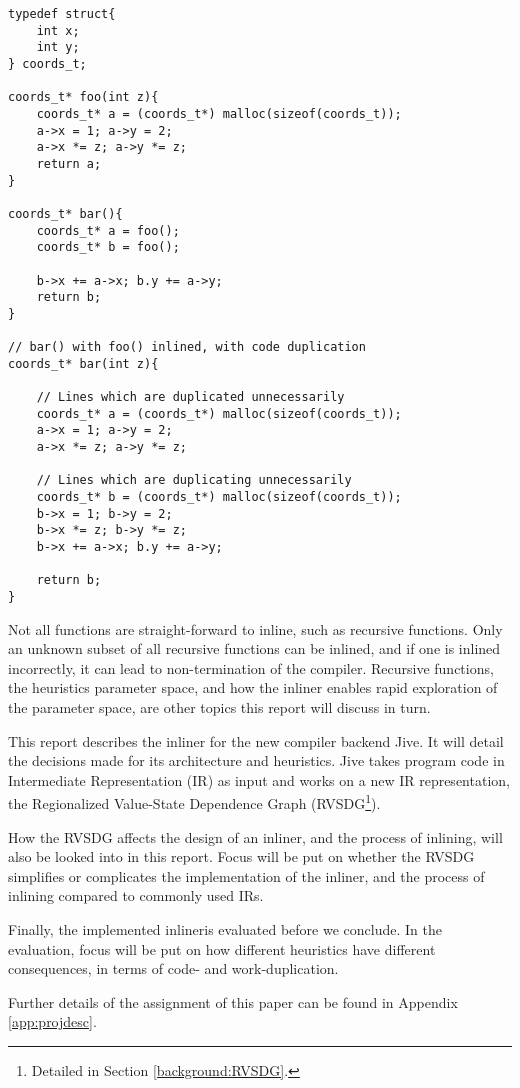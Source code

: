 \begin{lstlisting}[label={lst:code-dup}, style=customcpp,
caption={Code duplication in \textit{bar()}, when inlining \textit{foo()} into
\textit{bar()}. Total code size (counted by number of statements) for the
functions \textit{foo()} and \textit{bar()} are 11 when not inlined, and 13 when
inlined.}]
typedef struct{
	int x;
	int y;
} coords_t;

coords_t* foo(int z){
	coords_t* a = (coords_t*) malloc(sizeof(coords_t));
	a->x = 1; a->y = 2;
	a->x *= z; a->y *= z;
	return a;
}

coords_t* bar(){
	coords_t* a = foo();
	coords_t* b = foo();

	b->x += a->x; b.y += a->y;
	return b;
}

// bar() with foo() inlined, with code duplication
coords_t* bar(int z){

	// Lines which are duplicated unnecessarily
	coords_t* a = (coords_t*) malloc(sizeof(coords_t));
	a->x = 1; a->y = 2;
	a->x *= z; a->y *= z;

	// Lines which are duplicating unnecessarily
	coords_t* b = (coords_t*) malloc(sizeof(coords_t));
	b->x = 1; b->y = 2;
	b->x *= z; b->y *= z;
	b->x += a->x; b.y += a->y;

	return b;
}
\end{lstlisting}

Not all functions are straight-forward to inline, such as recursive functions.
Only an unknown subset of all recursive functions can be inlined, and if one is
inlined incorrectly, it can lead to non-termination of the compiler. Recursive
functions, the heuristics parameter space, and how the inliner enables rapid
exploration of the parameter space, are other topics this report will discuss in
turn.

This report describes the inliner for the new compiler backend Jive. It will
detail the decisions made for its architecture and heuristics. Jive takes
program code in Intermediate Representation (IR) as input and works on a new IR
representation, the Regionalized Value-State Dependence Graph
(RVSDG\footnote{Detailed in Section \ref{background:RVSDG}.}).


How the RVSDG affects the design of an inliner, and the process of inlining,
will also be looked into in this report. Focus will be put on whether the RVSDG
simplifies or complicates the implementation of the inliner, and the process of
inlining compared to commonly used IRs.

Finally, the implemented inlineris evaluated before we conclude. In the
evaluation, focus will be put on how different heuristics have different
consequences, in terms of code- and work-duplication.

Further details of the assignment of this paper can be found in Appendix
\ref{app:projdesc}.
